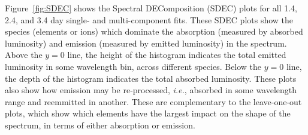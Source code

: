 \documentclass[twocolumn,twocolappendix]{aastex63}
\def\ie{{\it i.e.}}
\begin{document}
Figure~\ref{fig:SDEC} shows the Spectral DEComposition (SDEC) plots for all 1.4, 2.4, and 3.4 day single- and multi-component fits. These SDEC plots show the species (elements or ions) which dominate the absorption (measured by absorbed luminosity) and emission (measured by emitted luminosity) in the spectrum. Above the $y = 0$ line, the height of the histogram indicates the total emitted luminosity in some wavelength bin, across different species. Below the $y = 0$ line, the depth of the histogram indicates the total absorbed luminosity. These plots also show how emission may be re-processed, \ie, absorbed in some wavelength range and reemmitted in another. These are complementary to the leave-one-out plots, which show which elements have the largest impact on the shape of the spectrum, in terms of either absorption or emission.


\newlength{\SDECheight} %
\setlength{\SDECheight}{+5.6cm} %
\end{document}
